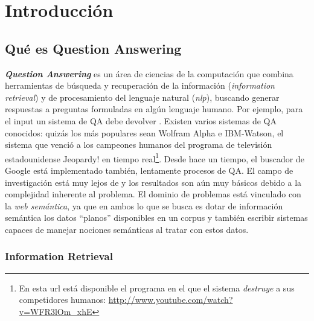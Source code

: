 \chapter{Introducción}
\section{Qué es Question Answering}
\textbf{\textit{Question Answering}} es un área de ciencias de la computación que combina herramientas de búsqueda y recuperación
de la información (\textit{information retrieval}) y de procesamiento del lenguaje natural (\textit{nlp}), buscando
generar respuestas a preguntas formuladas en algún lenguaje humano.
Por ejemplo, para el input \textit{} un sistema de QA debe devolver . 
Existen varios sistemas de QA conocidos: quizás los más populares sean Wolfram Alpha e IBM-Watson, el sistema que venció a los campeones humanos del 
programa de televisión estadounidense Jeopardy! en tiempo real\footnote{En esta url está disponible el programa en el que el sistema \textit{destruye} a sus competidores humanos: \url{http://www.youtube.com/watch?v=WFR3lOm_xhE}}. Desde hace un tiempo, el buscador de Google está implementado también, lentamente
procesos de QA. El campo de investigación está muy lejos de  y los resultados son aún muy básicos debido a la complejidad inherente al problema. 
El dominio de problemas está  vinculado con la \textit{web semántica}, ya que en ambos lo que se busca es dotar de
información semántica los datos {\textquotedblleft}planos{\textquotedblright} disponibles en un corpus y
también escribir sistemas capaces de manejar nociones semánticas al tratar con estos datos. 



\subsection{Information Retrieval}

